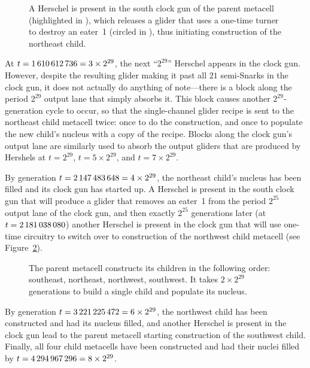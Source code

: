\begin{figure}[!htb]
	\centering
	\caption{A Herschel is present in the south clock gun of the parent metacell (highlighted in ), which releases a glider that uses a one-time turner to destroy an eater~1 (circled in ), thus initiating construction of the northeast child.}
	\label{fig:0e0p_timeline_1073741824}
\end{figure}

At $t = 1{\,}610{\,}612{\,}736 = 3 \times 2^{29}$, the next ``$2^{29}$'' Herschel appears in the clock gun. However, despite the resulting glider making it past all $21$ semi-Snarks in the clock gun, it does not actually do anything of note---there is a block along the period $2^{29}$ output lane that simply absorbs it. This block causes another $2^{29}$-generation cycle to occur, so that the single-channel glider recipe is sent to the northeast child metacell twice: once to do the construction, and once to populate the new child's nucleus with a copy of the recipe. Blocks along the clock gun's output lane are similarly used to absorb the output gliders that are produced by Hershels at $t = 2^{29}$, $t = 5 \times 2^{29}$, and $t = 7 \times 2^{29}$.

By generation $t = 2{\,}147{\,}483{\,}648 = 4 \times 2^{29}$, the northeast child's nucleus has been filled and its clock gun has started up. A Herschel is present in the south clock gun that will produce a glider that removes an eater~1 from the period $2^{25}$ output lane of the clock gun, and then exactly $2^{25}$ generations later (at $t = 2{\,}181{\,}038{\,}080$) another Herschel is present in the clock gun that will use one-time circuitry to switch over to construction of the northwest child metacell (see Figure~\ref{fig:0e0p_timeline_2147483648}).

\begin{figure}[!htb]
	\centering
	\caption{The parent metacell constructs its children in the following order: southeast, northeast, northwest, southwest. It takes $2 \times 2^{29}$ generations to build a single child and populate its nucleus.}
	\label{fig:0e0p_timeline_2147483648}
\end{figure}

By generation $t = 3{\,}221{\,}225{\,}472 = 6 \times 2^{29}$, the northwest child has been constructed and had its nucleus filled, and another Herschel is present in the clock gun lead to the parent metacell starting construction of the southwest child. Finally, all four child metacells have been constructed and had their nuclei filled by $t = 4{\,}294{\,}967{\,}296 = 8 \times 2^{29}$.



